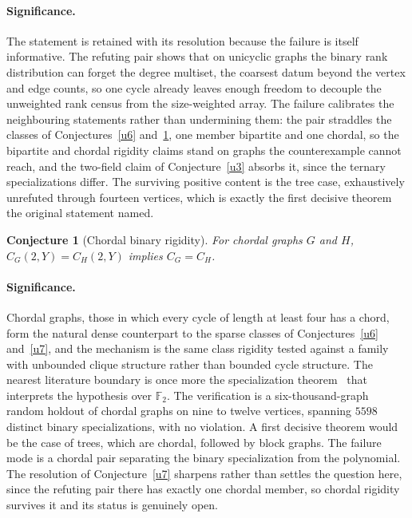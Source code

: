 \documentclass[11pt]{article}
\newtheorem{conjecture}{Conjecture}
\theoremstyle{definition}
\newcommand{\Fq}{\mathbb F}
\begin{document}
\paragraph{Significance.}
The statement is retained with its resolution because the failure is itself informative.  The refuting pair shows that on unicyclic graphs the binary rank distribution can forget the degree multiset, the coarsest datum beyond the vertex and edge counts, so one cycle already leaves enough freedom to decouple the unweighted rank census from the size-weighted array.  The failure calibrates the neighbouring statements rather than undermining them: the pair straddles the classes of Conjectures~\ref{u6} and~\ref{u8}, one member bipartite and one chordal, so the bipartite and chordal rigidity claims stand on graphs the counterexample cannot reach, and the two-field claim of Conjecture~\ref{u3} absorbs it, since the ternary specializations differ.  The surviving positive content is the tree case, exhaustively unrefuted through fourteen vertices, which is exactly the first decisive theorem the original statement named.


\begin{conjecture}[Chordal binary rigidity]\label{u8}
For chordal graphs $G$ and $H$, $C_G(2,Y)=C_H(2,Y)$ implies $C_G=C_H$.
\end{conjecture}

\paragraph{Significance.}
Chordal graphs, those in which every cycle of length at least four has a chord, form the natural dense counterpart to the sparse classes of Conjectures~\ref{u6} and~\ref{u7}, and the mechanism is the same class rigidity tested against a family with unbounded clique structure rather than bounded cycle structure.  The nearest literature boundary is once more the specialization theorem~\cite{Ros22} that interprets the hypothesis over $\Fq_2$.  The verification is a six-thousand-graph random holdout of chordal graphs on nine to twelve vertices, spanning $5598$ distinct binary specializations, with no violation.  A first decisive theorem would be the case of trees, which are chordal, followed by block graphs.  The failure mode is a chordal pair separating the binary specialization from the polynomial.  The resolution of Conjecture~\ref{u7} sharpens rather than settles the question here, since the refuting pair there has exactly one chordal member, so chordal rigidity survives it and its status is genuinely open.
\end{document}
